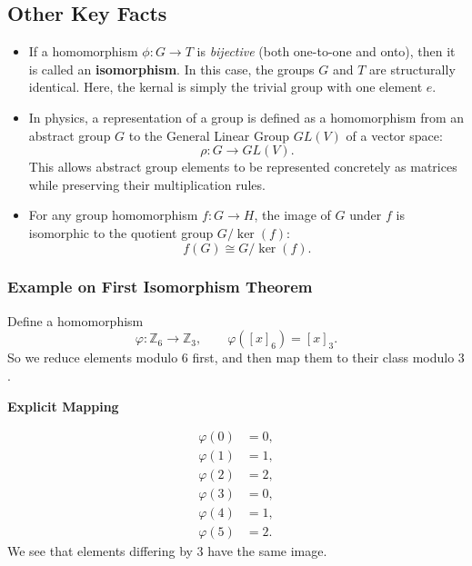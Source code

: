 \documentclass[a4paper,12pt]{article}
\theoremstyle{definition}
\begin{document}
\subsection{Other Key Facts}

\begin{itemize}

\item {}  
If a homomorphism $\phi : G \to T$ is \emph{bijective} (both one-to-one and onto), 
then it is called an \textbf{isomorphism}. In this case, the groups $G$ and $T$ are structurally identical. Here, the kernal is simply the trivial group with one element $e$.
\item {}  
In physics, a representation of a group is defined as a homomorphism from an abstract group $G$ to the General Linear Group $GL(V)$ of a vector space:
\begin{equation*}
\rho : G \to GL(V).
\end{equation*}
This allows abstract group elements to be represented concretely as matrices while preserving their multiplication rules.

\item {}  
For any group homomorphism $f : G \to H$, the image of $G$ under $f$ is isomorphic to the quotient group $G/\ker(f)$:
\begin{equation*}
f(G) \cong G/\ker(f).
\end{equation*}

\end{itemize}

\subsubsection*{Example on First Isomorphism Theorem}
Define a homomorphism
\begin{equation*}
\varphi : \mathbb{Z}_6 \to \mathbb{Z}_3,
\qquad
\varphi([x]_6) = [x]_3.
\end{equation*}
So we reduce elements modulo $6$ first, and then map them to their class modulo $3$.

\smallskip
\noindent\textbf{Explicit Mapping}

\begin{equation*}
\begin{aligned}
\varphi(0) &= 0, \\
\varphi(1) &= 1, \\
\varphi(2) &= 2, \\
\varphi(3) &= 0, \\
\varphi(4) &= 1, \\
\varphi(5) &= 2.
\end{aligned}
\end{equation*}
We see that elements differing by $3$ have the same image.
\end{document}
